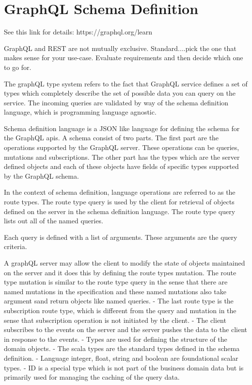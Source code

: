 \documentclass[a4paper, 11pt]{book}
\begin{document}
    \section{GraphQL Schema Definition}
    See this link for details: https://graphql.org/learn

    GraphQL and REST are not mutually exclusive.
    Standard....pick the one that makes sense for your use-case.
    Evaluate requirements and then decide which one to go for.

    The graphQL type system refers to the fact that GraphQL service defines a set of types which completely describe the set of possible data you can query on the service.
    The incoming queries are validated by way of the schema definition language, which is programming language agnostic.

    Schema definition language is a JSON like language for defining the schema for the GraphQL apis.
    A schema consist of two parts.
    The first part are the operations supported by the GraphQL server.
    These operations can be queries, mutations and subscriptions.
    The other part has the types which are the server defined objects and each of these objects have fields of specific types supported by the GraphQL schema.

    In the context of schema definition, language operations are referred to as the route types.
    The route type query is used by the client for retrieval of objects defined on the server in the schema definition language.
    The route type query lists out all of the named queries.

    Each query is defined with a list of arguments.
    These arguments are the query criteria.

    A graphQL server may allow the client to modify the state of objects maintained on the server and it does this by defining the route types mutation.
    The route type mutation is similar to the route type query in the sense that there are named mutations in the specification and these named mutations also take argument sand return objects like named queries.
    - The last route type is the subscription route type, which is different from the query and mutation in the sense that subscription operation is not initiated by the client.
    - The client subscribes to the events on the server and the server pushes the data to the client in response to the events.
    - Types are used for defining the structure of the domain objects.
    - The scala types are the standard types defined in the schema definition.
    - Language integer, float, string and boolean are foundational scalar types.
    - ID is a special type which is not part of the business domain data but is primarily used for managing the caching of the query data.
\end{document}
